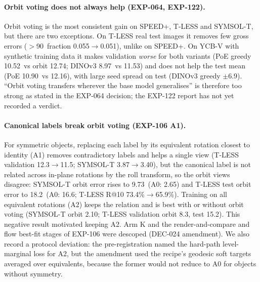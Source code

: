 \paragraph{Orbit voting does not always help (EXP-064, EXP-122).}
Orbit voting is the most consistent gain on SPEED+, T-LESS and SYMSOL-T, but there are two exceptions. On T-LESS real test images it removes few gross errors ($>$90\appDdeg\ fraction 0.055$\to$0.051), unlike on SPEED+. On YCB-V with synthetic training data it makes validation \emph{worse} for both variants (PoE greedy 10.52\appDdeg\ vs orbit 12.74\appDdeg; DINOv3 8.97\appDdeg\ vs 11.53\appDdeg) and does not help the test mean (PoE 10.90\appDdeg\ vs 12.16\appDdeg), with large seed spread on test (DINOv3 greedy $\pm$6.9\appDdeg). ``Orbit voting transfers wherever the base model generalises'' is therefore too strong as stated in the EXP-064 decision; the EXP-122 report has not yet recorded a verdict.

\paragraph{Canonical labels break orbit voting (EXP-106 A1).}
For symmetric objects, replacing each label by its equivalent rotation closest to identity (A1) removes contradictory labels and helps a single view (T-LESS validation 12.3\appDdeg$\to$11.5\appDdeg; SYMSOL-T 3.87\appDdeg$\to$3.40\appDdeg), but the canonical label is not related across in-plane rotations by the roll transform, so the orbit views disagree: SYMSOL-T orbit error rises to 9.73\appDdeg\ (A0: 2.65\appDdeg) and T-LESS test orbit error to 18.2\appDdeg\ (A0: 16.6\appDdeg; T-LESS R@10 73.4\%$\to$65.9\%). Training on all equivalent rotations (A2) keeps the relation and is best with or without orbit voting (SYMSOL-T orbit 2.10\appDdeg; T-LESS validation orbit 8.3\appDdeg, test 15.2\appDdeg). This negative result motivated keeping A2. Arm K and the render-and-compare and flow best-fit stages of EXP-106 were descoped (DEC-024 amendment). We also record a protocol deviation: the pre-registration named the hard-path level-marginal loss for A2, but the amendment used the recipe's geodesic soft targets averaged over equivalents, because the former would not reduce to A0 for objects without symmetry.

